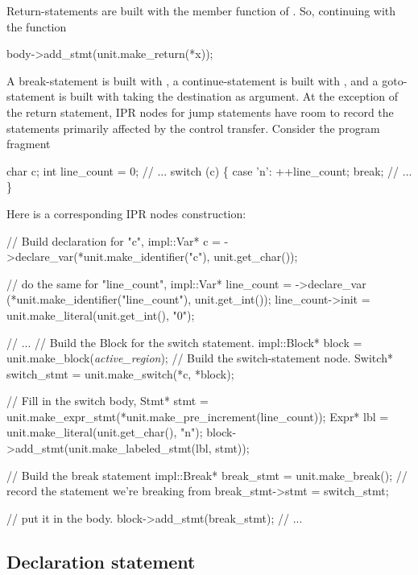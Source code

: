 \documentclass[11pt]{article}
\begin{document}
Return-statements are built with the member function  of 
. So, continuing with the  function
\begin{Program}
body->add_stmt(unit.make_return(*x));  
\end{Program}

A break-statement is built with , a continue-statement
is built with , and a goto-statement is built with
 taking the destination as argument. At the exception of
the return statement, IPR nodes for jump statements have room to record the
statements primarily affected by the control transfer.  Consider the program
fragment 
\begin{Program}
  char c;
  int line_count = 0;
  // ...
  switch (c) \{
    case '{\bslash}n':
      ++line_count;
      break;
    // ...
  \}
\end{Program}

Here is a corresponding IPR nodes construction:
\begin{Program}
  // Build declaration for "c",
  impl::Var* c = ->declare_var(*unit.make_identifier("c"),
                                                   unit.get_char());

  // do the same for "line_count", 
  impl::Var* line_count = ->declare_var
     (*unit.make_identifier("line_count"), unit.get_int());
  line_count->init = unit.make_literal(unit.get_int(), "0");

  // ...
  // Build the Block for the switch statement.
  impl::Block* block = unit.make_block(\textit{active_region});
  // Build the switch-statement node.
  Switch* switch_stmt = unit.make_switch(*c, *block);

  // Fill in the switch body,
  Stmt* stmt = unit.make_expr_stmt(*unit.make_pre_increment(line_count));
  Expr* lbl = unit.make_literal(unit.get_char(), "{\bslash}n");
  block->add_stmt(unit.make_labeled_stmt(lbl, stmt));

    // Build the break statement
  impl::Break* break_stmt = unit.make_break();
    // record the statement we're breaking from
  break_stmt->stmt = switch_stmt;

    // put it in the body.
  block->add_stmt(break_stmt);
  // ...
\end{Program}


\subsection{Declaration statement}
\label{sec:stmt.declaration}
\end{document}
